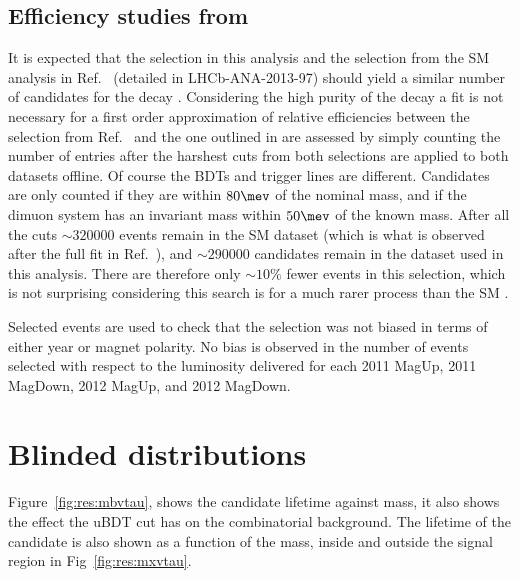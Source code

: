 
\subsection{Efficiency studies from \decay{\Bd}{\jpsi\Kstarz}}
\label{sec:eff:cross}
It is expected that the selection in this analysis and the selection from the SM analysis in
Ref.~\cite{LHCb-CONF-2015-002} (detailed in LHCb-ANA-2013-97)
should yield a similar number of candidates for the decay \decay{\Bd}{\jpsi\Kstarz}.
Considering the high purity of the decay \decay{\Bd}{\jpsi\Kstarz} a fit is not necessary for a
first order approximation of relative efficiencies between the selection from
Ref.~\cite{LHCb-CONF-2015-002} and the one outlined in  are assessed by simply
counting the number of entries after the harshest cuts from both selections are applied to both
datasets offline.
Of course the BDTs and trigger lines are different.
Candidates are only counted if they are within $80\mev$ of the nominal \Bd mass, and if the dimuon
system has an invariant mass within $50\mev$ of the known \jpsi mass.
After all the cuts $\sim320000$ events remain in the SM dataset (which is what is observed after
the full fit in Ref.~\cite{LHCb-CONF-2015-002}), and $\sim290000$ candidates remain in the dataset
used in this analysis.
There are therefore only $\sim10\%$ fewer events in this selection, which is not surprising
considering this search is for a much rarer process than the SM \decay{\Bd}{\Kstarz\mumu}.

Selected \decay{\Bd}{\jpsi\Kstarz} events are used to check that the selection was not biased in
terms of either year or magnet polarity.
No bias is observed in the number of events selected with respect to the luminosity delivered for
each 2011 MagUp, 2011 MagDown, 2012 MagUp, and 2012 MagDown.



\section{Blinded distributions}
\label{sec:results}

Figure~\ref{fig:res:mbvtau}, shows the \db candidate lifetime against \Bd
mass, it also shows the effect the uBDT cut has on the combinatorial background.
The lifetime of the \db candidate is also shown as a function of the \db mass, inside and outside
the \Bd signal region in Fig~\ref{fig:res:mxvtau}.

